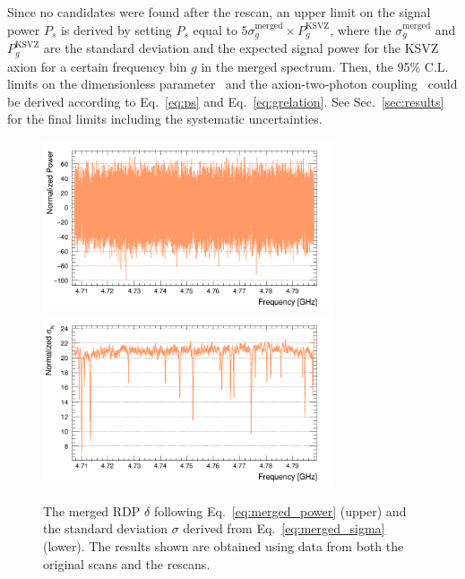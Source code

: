 Since no candidates were found after the rescan, an upper limit on 
the signal power $P_s$ is derived by setting $P_s$ equal to 
$5\sigma_{g}^\text{merged}\times P_{g}^\text{KSVZ}$, where 
the $\sigma_{g}^\text{merged}$ and $P_{g}^\text{KSVZ}$ are 
the standard deviation and the expected signal power for the KSVZ axion 
for a certain frequency bin $g$ in the merged spectrum. 
Then, the 95\% C.L. limits on the dimensionless parameter 
\ggamma\ and the axion-two-photon coupling \gagg\ could be derived 
according to Eq.~\eqref{eq:ps} and Eq.~\eqref{eq:grelation}. 
See Sec.~\ref{sec:results} for the final limits including the systematic 
uncertainties.

\begin{figure}[h]
    \centering
    \includegraphics[width=8.6cm]{figures/Power_GrandSpectrum_AxionRun_AllSteps_Rescan_Merged_5bin_SG4_W201_LqWeight.png}
    \includegraphics[width=8.6cm]{figures/Sigma_GrandSpectrum_AxionRun_AllSteps_Rescan_Merged_5bin_SG4_W201_LqWeight.png}
    \caption{The merged RDP $\delta$ following Eq.~\eqref{eq:merged_power} 
(upper) and the standard deviation $\sigma$ derived from Eq.~\eqref{eq:merged_sigma} (lower). The results shown are obtained using data from both the 
original scans and the rescans.}
    \label{fig:power_sigma_merged}
\end{figure}

